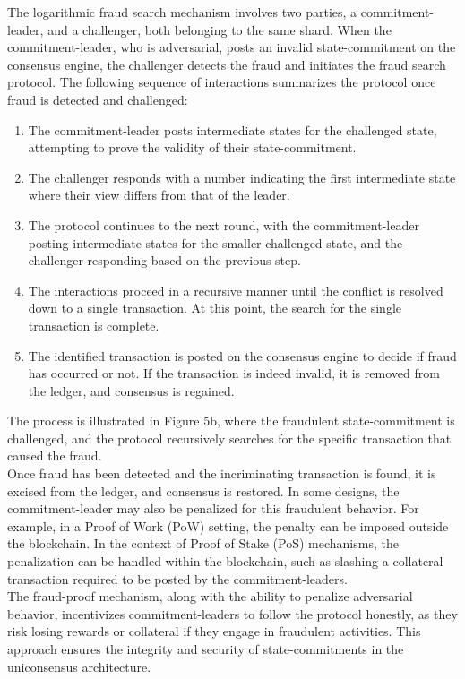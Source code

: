\begin{enumerate}
	The logarithmic fraud search mechanism involves two parties, a commitment-leader, and a challenger, both belonging to the same shard. When the commitment-leader, who is adversarial, posts an invalid state-commitment on the consensus engine, the challenger detects the fraud and initiates the fraud search protocol. The following sequence of interactions summarizes the protocol once fraud is detected and challenged:\\
	\begin{enumerate}
		\item The commitment-leader posts intermediate states for the challenged state, attempting to prove the validity of their state-commitment.
		\item The challenger responds with a number indicating the first intermediate state where their view differs from that of the leader.
		\item The protocol continues to the next round, with the commitment-leader posting intermediate states for the smaller challenged state, and the challenger responding based on the previous step.
		\item The interactions proceed in a recursive manner until the conflict is resolved down to a single transaction. At this point, the search for the single transaction is complete.
		\item The identified transaction is posted on the consensus engine to decide if fraud has occurred or not. If the transaction is indeed invalid, it is removed from the ledger, and consensus is regained.
	\end{enumerate}
	The process is illustrated in Figure 5b, where the fraudulent state-commitment is challenged, and the protocol recursively searches for the specific transaction that caused the fraud.\\
	Once fraud has been detected and the incriminating transaction is found, it is excised from the ledger, and consensus is restored. In some designs, the commitment-leader may also be penalized for this fraudulent behavior. For example, in a Proof of Work (PoW) setting, the penalty can be imposed outside the blockchain. In the context of Proof of Stake (PoS) mechanisms, the penalization can be handled within the blockchain, such as slashing a collateral transaction required to be posted by the commitment-leaders.\\
	The fraud-proof mechanism, along with the ability to penalize adversarial behavior, incentivizes commitment-leaders to follow the protocol honestly, as they risk losing rewards or collateral if they engage in fraudulent activities. This approach ensures the integrity and security of state-commitments in the uniconsensus architecture.
\end{enumerate} 
